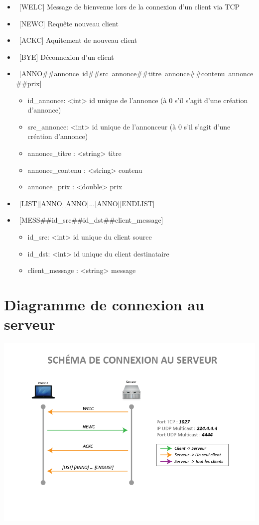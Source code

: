\documentclass[12pt]{article}
\begin{document}
\begin{itemize}
  \item~[WELC] Message de bienvenue lors de la connexion d'un client via TCP
  \item~[NEWC] Requête nouveau client
  \item~[ACKC] Aquitement de nouveau client
  \item~[BYE]  Déconnexion d'un client
  \item~[ANNO\#\#annonce~id\#\#src~annonce\#\#titre~annonce\#\#contenu~annonce\#\#prix]
  \begin{itemize}
    \item id\_annonce: <int>  id unique de l'annonce (à 0 s'il s'agit d'une création d'annonce)
    \item src\_annonce: <int> id unique de l'annonceur (à 0 s'il s'agit d'une création d'annonce)
    \item annonce\_titre : <string> titre
    \item annonce\_contenu : <string> contenu
    \item annonce\_prix : <double> prix
  \end{itemize}
  \item~[LIST][ANNO][ANNO]...[ANNO][ENDLIST]
  \item~[MESS\#\#id\_src\#\#id\_dst\#\#client\_message]
  \begin{itemize}
    \item id\_src: <int> id unique du client source 
    \item id\_dst: <int> id unique du client destinataire
    \item client\_message : <string> message
  \end{itemize}
\end{itemize}


\section{Diagramme de connexion au serveur}

\includegraphics[width=\textwidth]{rendu1/Protocole_Connection.png}
\end{document}
